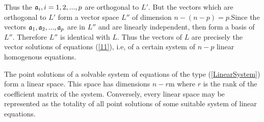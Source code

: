  Thus the $\mathfrak{a}_i, i =1,2, ..., p$ are orthogonal to $L'$. But the vectors which are orthogonal to $L'$ form a vector space $L''$ of dimension $n - (n-p) = p$.Since the vectors $\mathfrak{a}_1, \mathfrak{a}_2, ..., \mathfrak{a}_p$ are in $L''$ and are 
 linearly independent, then form a basis of $L''$. Therefore $L''$ is identical with $L$. Thus the vectors of $L$ are precisely the vector solutions of equations (\ref{11}), i.e, of a certain system of $n-p$ linear homogenous equations.
 
 \begin{theorem}
 The point solutions of a solvable system of equations of the type (\ref{LinearSystem}) form a linear space. This space has dimensions $n-r$m where $r$ is the rank of the coefficient matrix of the system. Conversely, every linear
 space may be represented as the totality of all point solutions of some suitable system of linear equations. 
 \end{theorem}
